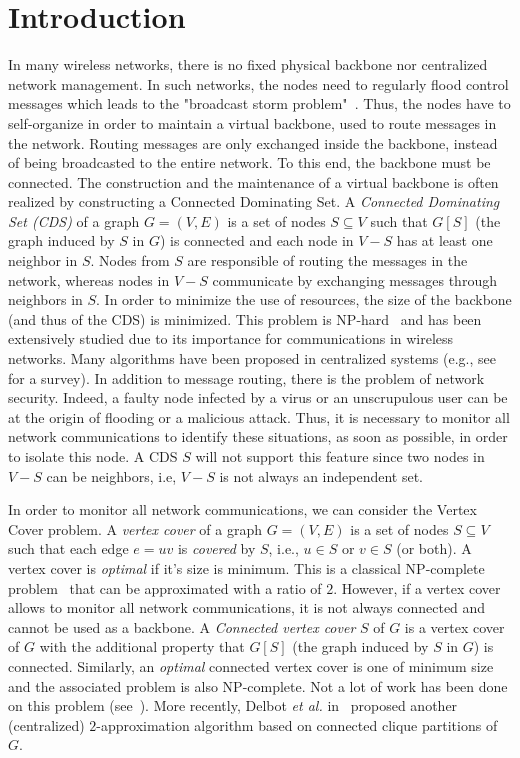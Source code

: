 \documentclass[11pt,letterpaper,onecolumn]{article}
\begin{document}
\section{Introduction}

In many wireless networks, there is no fixed physical backbone nor centralized network management. In such networks, the nodes need to regularly flood control messages which leads to the "broadcast  storm  problem"~\cite{NiTCS99}. Thus, the nodes have to self-organize in order to maintain a virtual backbone, used to route messages in the network. Routing messages are only exchanged inside the backbone, instead of being broadcasted to the entire network. To this end, the backbone must be connected.
The construction and the maintenance of a virtual backbone is often realized by constructing a Connected Dominating Set. A \emph{Connected Dominating Set (CDS)} of a graph $G=(V,E)$ is a set of nodes $S\subseteq V$ such that $G[S]$ (the graph induced by $S$ in $G$) is connected and each node in $V-S$ has at least one neighbor in $S$. Nodes from $S$ are responsible of routing the messages in the network, whereas nodes in $V-S$ communicate by exchanging messages through neighbors in $S$. In order to minimize the use of resources, the size of the backbone (and thus of the  CDS) is minimized. This problem is NP-hard~\cite{GJ79} and has been extensively studied due to its importance for communications in wireless networks. Many algorithms have been proposed in centralized systems (e.g., see~\cite{BlumDTC99} for a survey). In addition to message routing, there is the problem of network security. Indeed, a faulty node infected by a virus or an unscrupulous user can be at the origin of flooding or a malicious attack. Thus, it is necessary to monitor all network communications to identify these situations, as soon as possible, in order to isolate this node. A CDS $S$ will not support this feature since two nodes in $V-S$ can be neighbors, i.e, $V-S$ is not always an independent set.

In order to monitor all network communications, we can consider the Vertex Cover problem. A \emph{vertex cover} of a graph $G=(V,E)$ is a set of nodes $S \subseteq V$ such that each edge $e=uv$ is \emph{covered} by $S$, i.e., $u \in S$ or $v \in S$ (or both). A vertex cover is \emph{optimal} if it's size is minimum. This is a classical NP-complete problem~\cite{GJ79} that can be approximated with a ratio of $2$. However, if a vertex cover allows to monitor all network communications, it is not always connected and cannot be used as a backbone. A \emph{Connected vertex cover} $S$ of $G$ is a vertex cover of $G$ with the additional property that $G[S]$ (the graph induced by $S$ in $G$) is connected. Similarly, an \emph{optimal} connected vertex cover is one of minimum size and the associated problem is also NP-complete. Not a lot of work has been done on this problem (see~\cite{Savage82,EscoffierGouvesMonnot10}). More recently, Delbot \emph{et al.} in~\cite{DelbotLP13} proposed another (centralized) $2$-approximation algorithm based on connected clique partitions of $G$.
\end{document}
